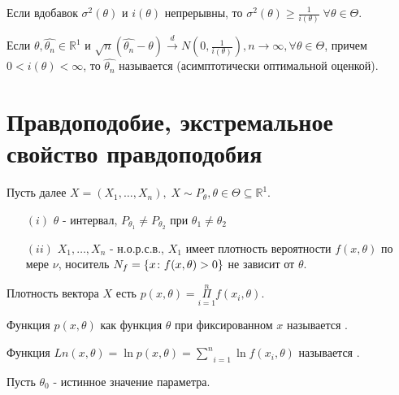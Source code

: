 \begin{remark}\label{lec:2/remark:1}
	Если вдобавок $\sigma^2 (\theta)$ и $i(\theta)$ непрерывны, то $\sigma^2 (\theta) \ge \frac{1}{i(\theta)} \; \forall \theta \in \Theta$.
\end{remark}

\begin{definition}\label{lec:2/def:1}
	Если $\theta, \hat{\theta_n} \in \mathbb{R}^1$ и $\sqrt{n} (\hat{\theta_n} - \theta) \xrightarrow[]{d} N(0, \frac{1}{i(\theta)}), n \to \infty, \forall \theta \in \Theta$, причем $0 < i(\theta) < \infty$, то $\hat{\theta_n}$ называется  (асимптотически оптимальной оценкой).
\end{definition}

\newpage
\section{Правдоподобие, экстремальное свойство правдоподобия}\label{lec:2/sec:2}

Пусть далее $X = (X_1, \dots, X_n), \; X \sim P_{\theta}, \theta \in \Theta \subseteq \mathbb{R}^1$.\\

\textbf{}
\begin{itemize}
	\item[$(i)$] $\theta$ - интервал, $P_{\theta_1} \not = P_{\theta_2}$ при $\theta_1 \not = \theta_2$
	\item[$(ii)$] $X_1, \dots, X_n$ - н.о.р.с.в., $X_1$ имеет плотность вероятности $f(x, \theta)$ по мере $\nu$, носитель $N_f = \left\{x\colon f(x, \theta) > 0\right\}$ не зависит от $\theta$.
\end{itemize}

Плотность вектора $X$ есть $p(x, \theta) = \underset{i=1}{\overset{n}{\Pi}} f(x_i, \theta)$.

\begin{definition}\label{lec:2/def:2}
	Функция $p(x, \theta)$ как функция $\theta$ при фиксированном $x$ называется .
\end{definition}

\begin{definition}\label{lec:2/def:3}
	Функция $Ln (x, \theta) = \ln p(x, \theta) = \underset{i=1}{\overset{n}{\sum}}\ln f(x_i, \theta)$ называется .
\end{definition}

Пусть $\theta_0$ - истинное значение параметра.

